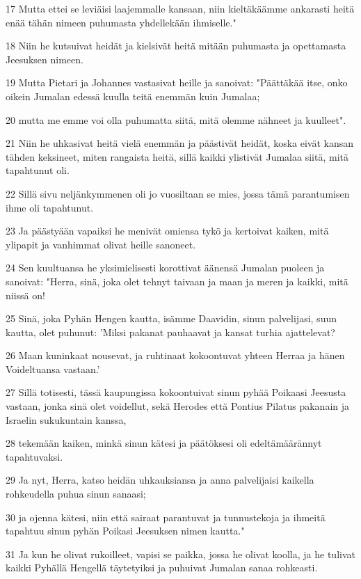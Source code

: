 \par 17 Mutta ettei se leviäisi laajemmalle kansaan, niin kieltäkäämme ankarasti heitä enää tähän nimeen puhumasta yhdellekään ihmiselle."
\par 18 Niin he kutsuivat heidät ja kielsivät heitä mitään puhumasta ja opettamasta Jeesuksen nimeen.
\par 19 Mutta Pietari ja Johannes vastasivat heille ja sanoivat: "Päättäkää itse, onko oikein Jumalan edessä kuulla teitä enemmän kuin Jumalaa;
\par 20 mutta me emme voi olla puhumatta siitä, mitä olemme nähneet ja kuulleet".
\par 21 Niin he uhkasivat heitä vielä enemmän ja päästivät heidät, koska eivät kansan tähden keksineet, miten rangaista heitä, sillä kaikki ylistivät Jumalaa siitä, mitä tapahtunut oli.
\par 22 Sillä sivu neljänkymmenen oli jo vuosiltaan se mies, jossa tämä parantumisen ihme oli tapahtunut.
\par 23 Ja päästyään vapaiksi he menivät omiensa tykö ja kertoivat kaiken, mitä ylipapit ja vanhimmat olivat heille sanoneet.
\par 24 Sen kuultuansa he yksimielisesti korottivat äänensä Jumalan puoleen ja sanoivat: "Herra, sinä, joka olet tehnyt taivaan ja maan ja meren ja kaikki, mitä niissä on!
\par 25 Sinä, joka Pyhän Hengen kautta, isämme Daavidin, sinun palvelijasi, suun kautta, olet puhunut: 'Miksi pakanat pauhaavat ja kansat turhia ajattelevat?
\par 26 Maan kuninkaat nousevat, ja ruhtinaat kokoontuvat yhteen Herraa ja hänen Voideltuansa vastaan.'
\par 27 Sillä totisesti, tässä kaupungissa kokoontuivat sinun pyhää Poikaasi Jeesusta vastaan, jonka sinä olet voidellut, sekä Herodes että Pontius Pilatus pakanain ja Israelin sukukuntain kanssa,
\par 28 tekemään kaiken, minkä sinun kätesi ja päätöksesi oli edeltämäärännyt tapahtuvaksi.
\par 29 Ja nyt, Herra, katso heidän uhkauksiansa ja anna palvelijaisi kaikella rohkeudella puhua sinun sanaasi;
\par 30 ja ojenna kätesi, niin että sairaat parantuvat ja tunnustekoja ja ihmeitä tapahtuu sinun pyhän Poikasi Jeesuksen nimen kautta."
\par 31 Ja kun he olivat rukoilleet, vapisi se paikka, jossa he olivat koolla, ja he tulivat kaikki Pyhällä Hengellä täytetyiksi ja puhuivat Jumalan sanaa rohkeasti.

